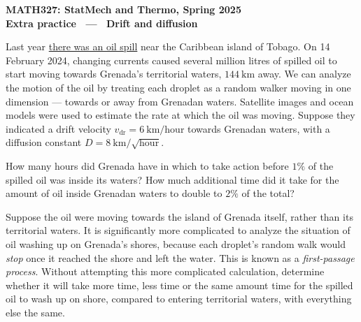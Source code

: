 \documentclass[12 pt]{article} %
\newcommand{\vdr}{\ensuremath{v_{\mathrm{dr}}} }
\begin{document}
\newcommand{\thisunit}{MATH327 Extra (Diffusion)}
\newcommand{\moddate}{Last modified 27 Feb.~2025}
\begin{center}
  {\Large \textbf{MATH327: StatMech and Thermo, Spring 2025}} \\[12 pt]
  {\Large \textbf{Extra practice \ --- \ Drift and diffusion}} \\[24 pt]
\end{center}

Last year \href{https://www.reuters.com/business/environment/tides-move-oil-spill-away-tobago-caribbean-cleanup-progresses-2024-02-14/}{there was an oil spill} near the Caribbean island of Tobago.
On 14 February 2024, changing currents caused several million litres of spilled oil to start moving towards Grenada's territorial waters, $144~\mathrm{km}$ away. %
We can analyze the motion of the oil by treating each droplet as a random walker moving in one dimension --- towards or away from Grenadan waters.
Satellite images and ocean models were used to estimate the rate at which the oil was moving.
Suppose they indicated a drift velocity $\vdr = 6~\mathrm{km}/\mathrm{hour}$ towards Grenadan waters, with a diffusion constant $D = 8~\mathrm{km}/\sqrt{\mathrm{hour}}$. %

How many hours did Grenada have in which to take action before $1\%$ of the spilled oil was inside its waters?
How much additional time did it take for the amount of oil inside Grenadan waters to double to $2\%$ of the total?

Suppose the oil were moving towards the island of Grenada itself, rather than its territorial waters.
It is significantly more complicated to analyze the situation of oil washing up on Grenada's shores, because each droplet's random walk would \textit{stop} once it reached the shore and left the water.
This is known as a \textit{first-passage process}.
Without attempting this more complicated calculation, determine whether it will take more time, less time or the same amount time for the spilled oil to wash up on shore, compared to entering territorial waters, with everything else the same.
\end{document}
